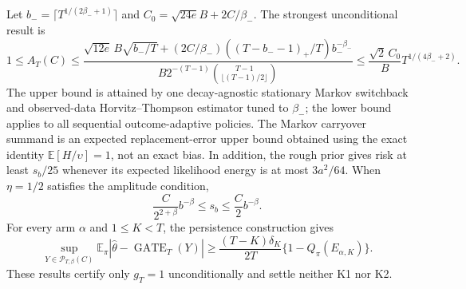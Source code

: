 Let \(b_-=\lceil T^{1/(2\beta_-+1)}\rceil\) and \(C_0=\sqrt{24e}B+2C/\beta_-\). The strongest unconditional result is
\[
1\le A_T(C)\le
\frac{\sqrt{12e}\,B\sqrt{b_-/T}+(2C/\beta_-)((T-b_--1)_+/T)b_-^{-\beta_-}}
{B2^{-(T-1)}\binom{T-1}{\lfloor(T-1)/2\rfloor}}
\le \frac{\sqrt2\,C_0}{B}T^{1/(4\beta_-+2)}.
\]
The upper bound is attained by one decay-agnostic stationary Markov switchback and observed-data Horvitz--Thompson estimator tuned to \(\beta_-\); the lower bound applies to all sequential outcome-adaptive policies. The Markov carryover summand is an expected replacement-error upper bound obtained using the exact identity \(\mathbb E[H/\upsilon]=1\), not an exact bias. In addition, the rough prior gives risk at least \(s_b/25\) whenever its expected likelihood energy is at most \(3a^2/64\). When \(\eta=1/2\) satisfies the amplitude condition,
\[
\frac{C}{2^{2+\beta}}b^{-\beta}\le s_b\le\frac C2b^{-\beta}.
\]
For every arm \(\alpha\) and \(1\le K<T\), the persistence construction gives
\[
\sup_{Y\in\mathcal P_{T,\beta}(C)}\mathbb E_\pi
\left|\widehat\theta-\operatorname{GATE}_T(Y)\right|
\ge
\frac{(T-K)\delta_K}{2T}\{1-Q_\pi(E_{\alpha,K})\}.
\]
These results certify only \(g_T=1\) unconditionally and settle neither K1 nor K2.